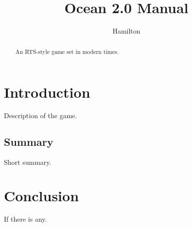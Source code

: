 \documentclass{article}
\begin{document}
\title{Ocean 2.0 Manual}
\author{Hamilton}
\maketitle

\begin{abstract}
An RTS-style game set in modern times.
\end{abstract}

\section{Introduction}
Description of the game.

\subsection{Summary}
Short summary.

\section{Conclusion}
If there is any.
\end{document}

